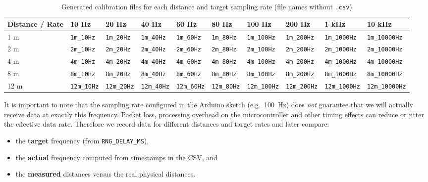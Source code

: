 \documentclass[a4paper,11pt]{article}
\begin{document}
\begin{table}[h]
	\centering
	\scriptsize
	\caption{Generated calibration files for each distance and target sampling rate
		(file names without \texttt{.csv})}
	\label{tab:csv-files}
	\setlength{\tabcolsep}{2pt}
	\begin{tabular}{p{1.2cm}*{9}{p{1.5cm}}}
		\toprule
		\cmidrule(lr){1-10}
		\textbf{Distance / Rate } &
		10 Hz & 20 Hz & 40 Hz & 60 Hz & 80 Hz & 100 Hz & 200 Hz & 1 kHz & 10 kHz \\
		\midrule
		1 m  &
		\texttt{1m\_10Hz}   &
		\texttt{1m\_20Hz}   &
		\texttt{1m\_40Hz}   &
		\texttt{1m\_60Hz}   &
		\texttt{1m\_80Hz}   &
		\texttt{1m\_100Hz}  &
		\texttt{1m\_200Hz}  &
		\texttt{1m\_1000Hz} &
		\texttt{1m\_10000Hz} \\
		2 m  &
		\texttt{2m\_10Hz}   &
		\texttt{2m\_20Hz}   &
		\texttt{2m\_40Hz}   &
		\texttt{2m\_60Hz}   &
		\texttt{2m\_80Hz}   &
		\texttt{2m\_100Hz}  &
		\texttt{2m\_200Hz}  &
		\texttt{2m\_1000Hz} &
		\texttt{2m\_10000Hz} \\
		4 m  &
		\texttt{4m\_10Hz}   &
		\texttt{4m\_20Hz}   &
		\texttt{4m\_40Hz}   &
		\texttt{4m\_60Hz}   &
		\texttt{4m\_80Hz}   &
		\texttt{4m\_100Hz}  &
		\texttt{4m\_200Hz}  &
		\texttt{4m\_1000Hz} &
		\texttt{4m\_10000Hz} \\
		8 m  &
		\texttt{8m\_10Hz}   &
		\texttt{8m\_20Hz}   &
		\texttt{8m\_40Hz}   &
		\texttt{8m\_60Hz}   &
		\texttt{8m\_80Hz}   &
		\texttt{8m\_100Hz}  &
		\texttt{8m\_200Hz}  &
		\texttt{8m\_1000Hz} &
		\texttt{8m\_10000Hz} \\
		12 m &
		\texttt{12m\_10Hz}   &
		\texttt{12m\_20Hz}   &
		\texttt{12m\_40Hz}   &
		\texttt{12m\_60Hz}   &
		\texttt{12m\_80Hz}   &
		\texttt{12m\_100Hz}  &
		\texttt{12m\_200Hz}  &
		\texttt{12m\_1000Hz} &
		\texttt{12m\_10000Hz} \\
		\bottomrule
	\end{tabular}
\end{table}

	
	It is important to note that the sampling rate configured in the Arduino sketch
	(e.g.\ 100~Hz) does \emph{not} guarantee that we will actually receive data at
	exactly this frequency. Packet loss, processing overhead on the microcontroller
	and other timing effects can reduce or jitter the effective data rate.  
	Therefore we record data for different distances and target rates and later
	compare:
	
	\begin{itemize}
		\item the \textbf{target} frequency (from \texttt{RNG\_DELAY\_MS}),
		\item the \textbf{actual} frequency computed from timestamps in the CSV, and
		\item the \textbf{measured} distances versus the real physical distances.
	\end{itemize}
	
\end{document}
